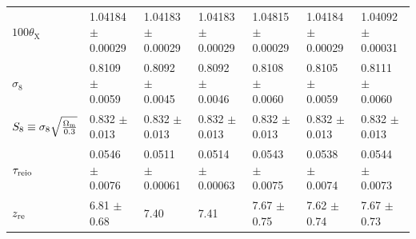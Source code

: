 \begin{landscape}
\begin{table}
\begin{tabular}{l l l l l l l}
$100 \theta_\mathrm{X}$ & \cellcolor[gray]{0.9} 1.04184 $\pm$ 0.00029 & 1.04183 $\pm$ 0.00029 & 1.04183 $\pm$ 0.00029 & \cellcolor[gray]{0.9} 1.04815 $\pm$ 0.00029 & 1.04184 $\pm$ 0.00029 & \cellcolor[gray]{0.9} 1.04092 $\pm$ 0.00031 \\
$\sigma_8$ & 0.8109 $\pm$ 0.0059 & \cellcolor[gray]{0.9} 0.8092 $\pm$ 0.0045 & \cellcolor[gray]{0.9} 0.8092 $\pm$ 0.0046 & 0.8108 $\pm$ 0.0060 & \cellcolor[gray]{0.9} 0.8105 $\pm$ 0.0059 & 0.8111 $\pm$ 0.0060 \\  
$S_8 \equiv \sigma_8 \sqrt{\frac{\Omega_\mathrm{m}}{0.3}}$ & 0.832 $\pm$ 0.013 & 0.832 $\pm$ 0.013 & 0.832 $\pm$ 0.013 & 0.832 $\pm$ 0.013 & 0.832 $\pm$ 0.013 & 0.832 $\pm$ 0.013 \\
$\tau_{\mathrm{reio}}$ & \cellcolor[gray]{0.9} 0.0546 $\pm$ 0.0076 & 0.0511 $\pm$ 0.00061 & 0.0514 $\pm$ 0.00063 & \cellcolor[gray]{0.9} 0.0543 $\pm$ 0.0075 & 0.0538 $\pm$ 0.0074 & \cellcolor[gray]{0.9} 0.0544 $\pm$ 0.0073 \\
$z_{\mathrm{re}}$ & 6.81 $\pm$ 0.68 & 7.40 & 7.41 & 7.67 $\pm$ 0.75 & \cellcolor[gray]{0.9} 7.62 $\pm$ 0.74 & 7.67 $\pm$ 0.73 \\
\bottomrule
\end{tabular}
\label{tab:uber-table}
\end{table}
\end{landscape}




